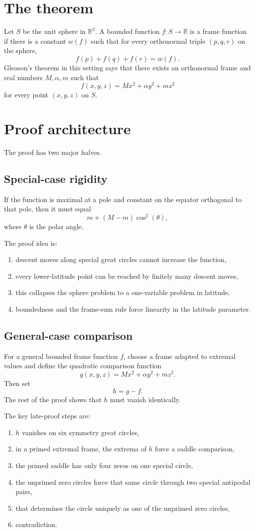 \documentclass[11pt]{article}
\begin{document}
\section{The theorem}
Let $S$ be the unit sphere in $\mathbb{R}^3$. A bounded function $f : S \to \mathbb{R}$ is a frame function if there is a constant $w(f)$ such that for every orthonormal triple $(p,q,r)$ on the sphere,
\[
f(p) + f(q) + f(r) = w(f).
\]
Gleason's theorem in this setting says that there exists an orthonormal frame and real numbers $M,\alpha,m$ such that
\[
f(x,y,z) = Mx^2 + \alpha y^2 + mz^2
\]
for every point $(x,y,z)$ on $S$.

\section{Proof architecture}
The proof has two major halves.

\subsection{Special-case rigidity}
If the function is maximal at a pole and constant on the equator orthogonal to that pole, then it must equal
\[
m + (M-m)\cos^2(\theta),
\]
where $\theta$ is the polar angle.

The proof idea is:
\begin{enumerate}[label=\arabic*.]
\item descent moves along special great circles cannot increase the function,
\item every lower-latitude point can be reached by finitely many descent moves,
\item this collapses the sphere problem to a one-variable problem in latitude,
\item boundedness and the frame-sum rule force linearity in the latitude parameter.
\end{enumerate}

\subsection{General-case comparison}
For a general bounded frame function $f$, choose a frame adapted to extremal values and define the quadratic comparison function
\[
g(x,y,z) = Mx^2 + \alpha y^2 + mz^2.
\]
Then set
\[
h = g - f.
\]
The rest of the proof shows that $h$ must vanish identically.

The key late-proof steps are:
\begin{enumerate}[label=\arabic*.]
\item $h$ vanishes on six symmetry great circles,
\item in a primed extremal frame, the extrema of $h$ force a saddle comparison,
\item the primed saddle has only four zeros on one special circle,
\item the unprimed zero circles force that same circle through two special antipodal pairs,
\item that determines the circle uniquely as one of the unprimed zero circles,
\item contradiction.
\end{enumerate}
\end{document}
